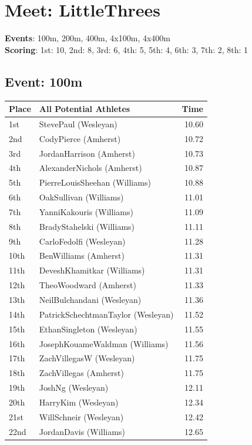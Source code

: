 \documentclass[11pt]{article}
\begin{document}
\section*{Meet: LittleThrees}

\textbf{Events}: 100m, 200m, 400m, 4x100m, 4x400m\\

\noindent\textbf{Scoring}: 1st: 10, 2nd: 8, 3rd: 6, 4th: 5, 5th: 4, 6th: 3, 7th: 2, 8th: 1\\

\subsection*{Event: 100m}
\begin{tabularx}{\linewidth}{lXr}
\toprule
Place & All Potential Athletes & Time \\
\midrule
1st & StevePaul (Wesleyan) & 10.60 \\
2nd & CodyPierce (Amherst) & 10.72 \\
3rd & JordanHarrison (Amherst) & 10.73 \\
4th & AlexanderNichols (Amherst) & 10.87 \\
5th & PierreLouisSheehan (Williams) & 10.88 \\
6th & OakSullivan (Williams) & 11.01 \\
7th & YanniKakouris (Williams) & 11.09 \\
8th & BradyStahelski (Williams) & 11.11 \\
9th & CarloFedolfi (Wesleyan) & 11.28 \\
10th & BenWilliams (Amherst) & 11.31 \\
11th & DeveshKhamitkar (Williams) & 11.31 \\
12th & TheoWoodward (Amherst) & 11.33 \\
13th & NeilBulchandani (Wesleyan) & 11.36 \\
14th & PatrickSchechtmanTaylor (Wesleyan) & 11.52 \\
15th & EthanSingleton (Wesleyan) & 11.55 \\
16th & JosephKouameWaldman (Williams) & 11.56 \\
17th & ZachVillegasW (Wesleyan) & 11.75 \\
18th & ZachVillegas (Amherst) & 11.75 \\
19th & JoshNg (Wesleyan) & 12.11 \\
20th & HarryKim (Wesleyan) & 12.34 \\
21st & WillSchneir (Wesleyan) & 12.42 \\
22nd & JordanDavis (Williams) & 12.65 \\
\bottomrule
\end{tabularx}
\end{document}
